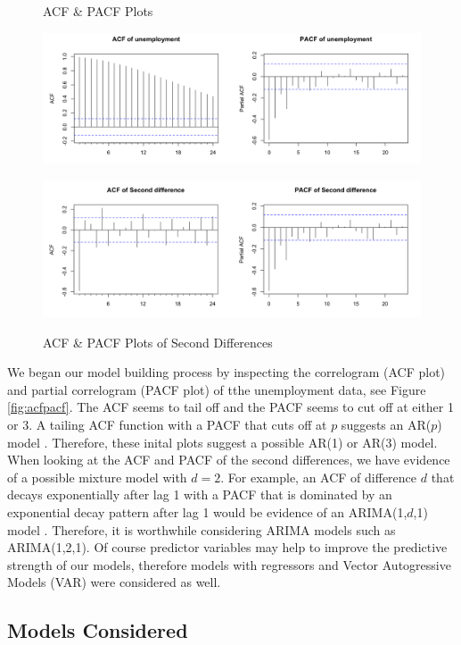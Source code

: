 \documentclass[twoside,twocolumn]{article}
\begin{document}
 
    \begin{figure}[hbt]
    	\centering
     	\caption{ACF \& PACF Plots}
     	\includegraphics[width=\linewidth]{images/acfpacf}
     	\label{fig:acfpacf}
     	\caption{ACF \& PACF Plots of Second Differences}
     	\includegraphics[width=\linewidth]{images/acfpacf2d}
     	\label{fig:acfpacf2}
      \end{figure}

  We began our model building process by inspecting the correlogram (ACF plot) and partial correlogram (PACF plot) of tthe unemployment data, see Figure \ref{fig:acfpacf}. The ACF seems to tail off and the PACF seems to cut off at either 1 or 3.  A tailing ACF function with a PACF that cuts off at \(p\) suggests an AR(\(p\)) model \citep{Box2008}. Therefore, these inital plots suggest a possible AR(1) or AR(3) model. When looking at the ACF and PACF of the second differences, we have evidence of a possible mixture model with \(d=2\). For example, an ACF of difference \(d\) that decays exponentially after lag 1 with a PACF that is dominated by an exponential decay pattern after lag 1 would be evidence of an ARIMA(1,\(d\),1) model . Therefore, it is worthwhile considering ARIMA models such as ARIMA(1,2,1). Of course predictor variables may help to improve the predictive strength of our models, therefore models with regressors and Vector Autogressive Models (VAR) were considered as well.

\subsection{Models Considered}
\end{document}
